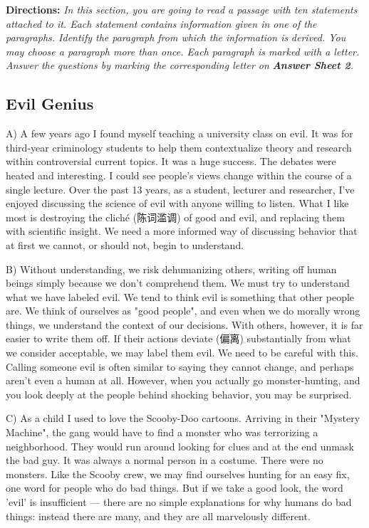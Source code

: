 \documentclass[UTF8,11pt]{ctexart}
\begin{document}
\textbf{Directions:} \textit{In this section, you are going to read a passage with ten statements attached to it. Each statement} \textit{contains information given in one of the paragraphs. Identify the paragraph from which the information is} \textit{derived. You may choose a paragraph more than once. Each paragraph is marked with a letter. Answer the} \textit{questions by marking the corresponding letter on }\textbf{\textit{Answer Sheet 2}}\textit{.}


\subsection*{\textbf{Evil Genius}}


A) A few years ago I found myself teaching a university class on evil. It was for third-year criminology students to help them contextualize theory and research within controversial current topics. It was a huge success. The debates were heated and interesting. I could see people's views change within the course of a single lecture. Over the past 13 years, as a student, lecturer and researcher, I've enjoyed discussing the science of evil with anyone willing to listen. What I like most is destroying the cliché (陈词滥调) of good and evil, and replacing them with scientific insight. We need a more informed way of discussing behavior that at first we cannot, or should not, begin to understand.


B) Without understanding, we risk dehumanizing others, writing off human beings simply because we don't comprehend them. We must try to understand what we have labeled evil. We tend to think evil is something that other people are. We think of ourselves as "good people", and even when we do morally wrong things, we understand the context of our decisions. With others, however, it is far easier to write them off. If their actions deviate (偏离) substantially from what we consider acceptable, we may label them evil. We need to be careful with this. Calling someone evil is often similar to saying they cannot change, and perhaps aren't even a human at all. However, when you actually go monster-hunting, and you look deeply at the people behind shocking behavior, you may be surprised.


C) As a child I used to love the Scooby-Doo cartoons. Arriving in their "Mystery Machine", the gang would have to find a monster who was terrorizing a neighborhood. They would run around looking for clues and at the end unmask the bad guy. It was always a normal person in a costume. There were no monsters. Like the Scooby crew, we may find ourselves hunting for an easy fix, one word for people who do bad things. But if we take a good look, the word 'evil' is insufficient — there are no simple explanations for why humans do bad things: instead there are many, and they are all marvelously different.
\end{document}
